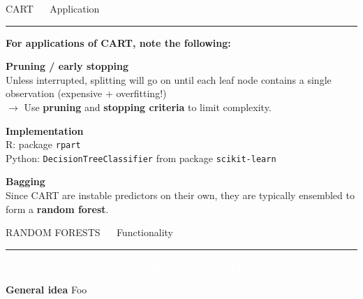 \documentclass[11pt,compress,t,notes=noshow, xcolor=table]{beamer}
\begin{document}

\LARGE
\begin{frame}{\textcolor{gray!80}{CART} ~~ Application}
\normalsize
\vspace{-0.5cm}
\noindent \textcolor{gray!80}{\rule{\textwidth}{1pt}}

\vspace{0.3cm}

\textbf{For applications of CART, note the following:}
\lz

\textbf{\textcolor{gray!80}{Pruning / early stopping}} \\
\smallskip
Unless interrupted, splitting will go on until each leaf node contains a single 
observation (expensive + overfitting!) \\
\smallskip
$\rightarrow$ Use \textbf{pruning} and \textbf{stopping criteria} to limit 
complexity.

\lz
\textbf{\textcolor{gray!80}{Implementation}} \\
\smallskip
R: package \texttt{rpart}\\
Python: \texttt{DecisionTreeClassifier} from package \texttt{scikit-learn}

\lz
\textbf{\textcolor{gray!80}{Bagging}} \\
\smallskip
Since CART are instable predictors on their own, they are typically ensembled
to form a \textbf{random forest}.

\end{frame}



\LARGE
\begin{frame}{\textcolor{gray!80}{RANDOM FORESTS} ~~ Functionality}
\normalsize
\vspace{-0.5cm}
\noindent \textcolor{gray!80}{\rule{\textwidth}{1pt}}

\vspace{0.2cm}

\scriptsize

\colorbox{gray!80}{\textcolor{white}{SUPERVISED}} 
\colorbox{gray!80}{\textcolor{white}{NON-PARAMETRIC}} 
\colorbox{gray!80}{\textcolor{white}{BLACK-BOX}} 
\colorbox{gray!80}{\textcolor{white}{FEATURE SELECTION}}

\medskip

\textbf{\textcolor{gray!80}{General idea}} {}{} Foo

\end{frame}
\end{document}

